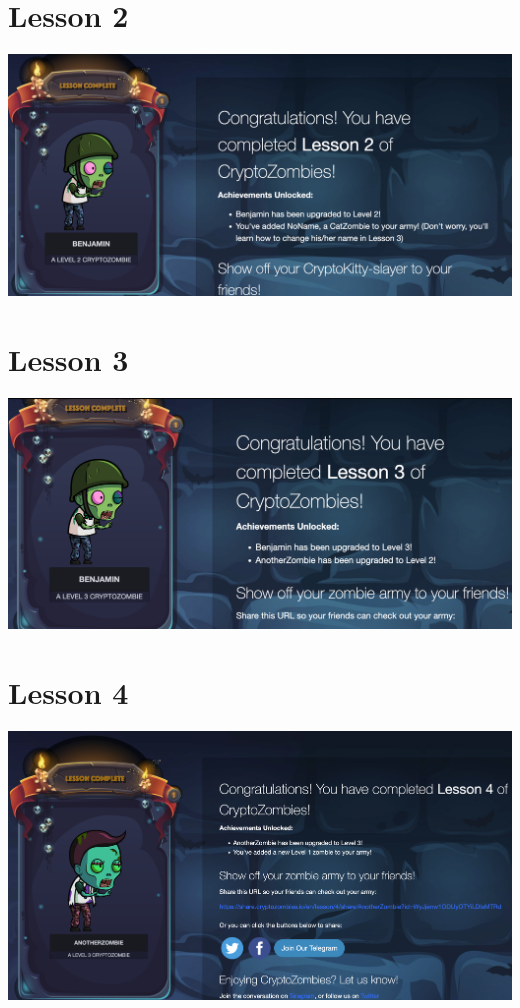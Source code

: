 \documentclass[14pt,a4paper]{extarticle}
\begin{document}
	\section*{Lesson 2}
	\includegraphics[width=\textwidth]{images/lesson2.png}

	\section*{Lesson 3}
	\includegraphics[width=\textwidth]{images/lesson3.png}

	\section*{Lesson 4}
	\includegraphics[width=\textwidth]{images/lesson4.png}
\end{document}
